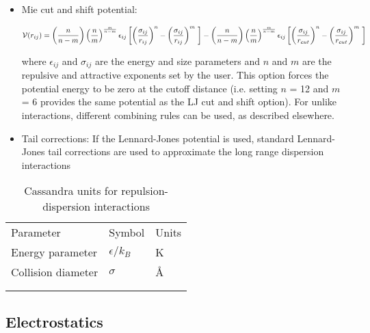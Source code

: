 \begin{itemize}
\item Mie cut and shift potential:

\begin{equation}
 {\cal V}(r_{ij})=  \left ( \frac{n}{n-m} \right ) \left ( \frac {n}{m} \right )^{\frac{m}{n-m}}\epsilon_{ij} \left [  \left ( \frac {\sigma_{ij}} { r_{ij} }\right )^{n} - \left ( \frac {\sigma_{ij}} { r_{ij} }\right )^{m}\ \right  ] -  \left ( \frac{n}{n-m} \right ) \left ( \frac {n}{m} \right )^{\frac{m}{n-m}}\epsilon_{ij} \left [  \left ( \frac {\sigma_{ij}} { r_{cut}}\right )^{n} - \left ( \frac {\sigma_{ij}} { r_{cut} }\right )^{m}\ \right]  
 \label{Eq:mie_cut_shift}
\end{equation}



where $\epsilon_{ij}$ and $\sigma_{ij}$ are the energy and size
parameters and $n$ and $m$ are the repulsive and attractive exponents set by the user. This
option forces the potential energy to be zero at the cutoff
distance (i.e. setting $n$ = 12 and $m$ = 6 provides the same potential as the LJ cut and shift option). For unlike interactions, different 
combining rules can be used, as described elsewhere.


\item Tail corrections: If the Lennard-Jones potential is used, standard Lennard-Jones tail corrections are used to approximate the long range dispersion interactions

\end{itemize}

\begin{center}
\begin{table}[h]
	\begin{center}
	\caption{Cassandra units for repulsion-dispersion interactions}
	\begin{tabular} {l l l} \\ \hline \hline
	 Parameter & Symbol &  Units \\
	Energy parameter 	& $\epsilon/k_B$ & K \\
	Collision diameter &	 $\sigma$ & \AA \\ \\ \hline \\
	\end{tabular}
	\end{center}
	\label{Tab:LJ_Units}
\end{table}
\end{center}

\subsection{Electrostatics}\label{Sec:qq}

